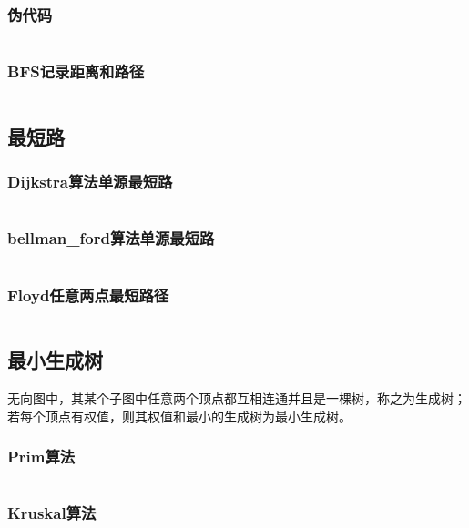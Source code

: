 \documentclass[a4paper,11pt]{article}
\begin{document}
\subsubsection{伪代码}
\inputminted[breaklines,linenos,frame=leftline]{c++}{graph/bfs1.cpp}
\subsubsection{BFS记录距离和路径}
\inputminted[breaklines,linenos,frame=leftline]{c++}{graph/bfs2.cpp}

\subsection{最短路}
\subsubsection{Dijkstra算法单源最短路}
\inputminted[breaklines,linenos,frame=leftline]{c++}{graph/shortest1.cpp}
\subsubsection{bellman\_ford算法单源最短路}
\inputminted[breaklines,linenos,frame=leftline]{c++}{graph/shortest2.cpp}
\subsubsection{Floyd任意两点最短路径}
\inputminted[breaklines,linenos,frame=leftline]{c++}{graph/shortest3.cpp}

\subsection{最小生成树} %
无向图中，其某个子图中任意两个顶点都互相连通并且是一棵树，称之为生成树；若每个顶点有权值，则其权值和最小的生成树为最小生成树。
\subsubsection{Prim算法}
\inputminted[breaklines,linenos,frame=leftline]{c++}{graph/prim.cpp}
\subsubsection{Kruskal算法} %
\inputminted[breaklines,linenos,frame=leftline]{c++}{graph/kruskal.cpp}




\newpage
\end{document}
